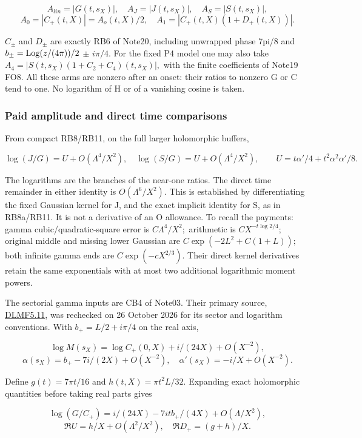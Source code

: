 \[
A_{lin}=|G(t,s_X)|,\quad A_J=|J(t,s_X)|,\quad A_S=|S(t,s_X)|,
\]
\[
A_0=|C_+(t,X)|=A_o(t,X)/2,\quad
A_1=|C_+(t,X)(1+D_+(t,X))|.
\tag{NC3}\label{eq:ansatz-nc3}
\]

\(C_{\pm}\) and \(D_{\pm}\) are exactly RB6 of Note20, including unwrapped phase 7pi/8 and \(b_{\pm}=\operatorname{Log}(z/(4\pi))/2\) $\pm$ \(i \pi/4.\) For the fixed P4 model one may also take \(A_4=|S(t,s_{X})(1+C_{2}+C_{4})(t,s_{X})|,\) with the finite coefficients of Note19 FO8. All these arms are nonzero after an onset: their ratios to nonzero G or C tend to one. No logarithm of H or of a vanishing cosine is taken.

\subsubsection{Paid amplitude and direct time comparisons}
\label{subsec:nc-2}

From compact RB8/RB11, on the full larger holomorphic buffers,

\[
\log(J/G)=U+O(\Lambda^4/X^2),\quad
\log(S/G)=U+O(\Lambda^4/X^2),\qquad
U=t\alpha'/4+t^2\alpha^2\alpha'/8.
\tag{NC4}\label{eq:ansatz-nc4}
\]

The logarithms are the branches of the near-one ratios. The direct time remainder in either identity is \(O(\Lambda^{6}/X^{2}).\) This is established by differentiating the fixed Gaussian kernel for J, and the exact implicit identity for S, as in RB8a/RB11. It is not a derivative of an O allowance. To recall the payments: gamma cubic/quadratic-square error is \(C \Lambda^{4}/X^{2};\) arithmetic is \(C X^{-t \log2/4};\) original middle and missing lower Gaussian are \(C \exp(-2L^{2}+C(1+L));\) both infinite gamma ends are \(C \exp(-c X^{2/3}).\) Their direct kernel derivatives retain the same exponentials with at most two additional logarithmic moment powers.

The sectorial gamma inputs are CB4 of Note03. Their primary source, \href{https://dlmf.nist.gov/5.11}{DLMF5.11}, was rechecked on 26 October 2026 for its sector and logarithm conventions. With \(b_+=L/2+i \pi/4\) on the real axis,

\[
\log M(s_X)=\log C_+(0,X)+i/(24X)+O(X^{-2}),
\]
\[
\alpha(s_X)=b_+-7i/(2X)+O(X^{-2}),\quad
\alpha'(s_X)=-i/X+O(X^{-2}).
\tag{NC5}\label{eq:ansatz-nc5}
\]

Define \(g(t)=7\pi t/16\) and \(h(t,X)=\pi t^{2} L/32.\) Expanding exact holomorphic quantities before taking real parts gives

\[
\log(G/C_+)=i/(24X)-7itb_+/(4X)+O(\Lambda/X^2),
\]
\[
\Re U=h/X+O(\Lambda^2/X^2),\quad
\Re D_+=(g+h)/X.
\tag{NC6}\label{eq:ansatz-nc6}
\]

